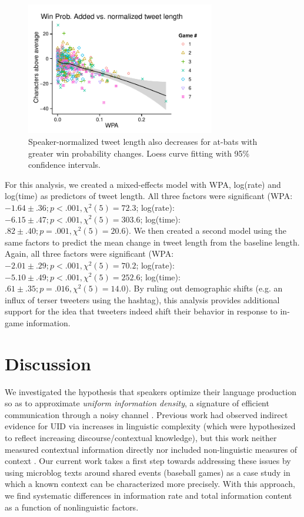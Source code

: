 \documentclass[11pt,letterpaper]{article}
\begin{document}
\begin{figure}
 \centering
  \includegraphics[width=3.25in]{figures/fig4.pdf}
 \caption{Speaker-normalized tweet length also decreases for at-bats with greater win probability changes. Loess curve fitting with 95\% confidence intervals.}\label{fig:wpa-ld-agg}\vspace*{-.5em}
\end{figure}

For this analysis, we created a mixed-effects model with WPA, log(rate) and log(time) as predictors of tweet length.  All three factors were significant (WPA: $-1.64 \pm .36; p<.001, \chi^2(5)=72.3$; log(rate): $-6.15 \pm .47; p<.001, \chi^2(5) =303.6 $; log(time): $.82 \pm .40; p=.001, \chi^2(5)=20.6$).  We then created a second model using the same factors to predict the mean change in tweet length from the baseline length. Again, all three factors were significant (WPA: $-2.01 \pm .29; p<.001, \chi^2(5)=70.2$; log(rate): $-5.10 \pm .49; p<.001, \chi^2(5) = 252.6$; log(time): $.61 \pm .35; p=.016, \chi^2(5)=14.0$).  By ruling out demographic shifts (e.g. an influx of terser tweeters using the hashtag), this analysis provides additional support for the idea that tweeters indeed shift their behavior in response to in-game information.

\section{Discussion}

We investigated the hypothesis that speakers optimize their language production so as to approximate \emph{uniform information density}, a signature of efficient communication through a noisy channel \cite{shannon1948,levy2007}. Previous work had observed indirect evidence for UID via increases in linguistic complexity (which were hypothesized to reflect increasing discourse/contextual knowledge), but this work neither measured contextual information directly nor included non-linguistic measures of context \cite{genzel2002,genzel2003,qian2012}. Our current work takes a first step towards addressing these issues by using microblog texts around shared events (baseball games) as a case study in which a known context can be characterized more precisely. With this approach, we find systematic differences in information rate and total information content as a function of nonlinguistic factors. 
\end{document}
